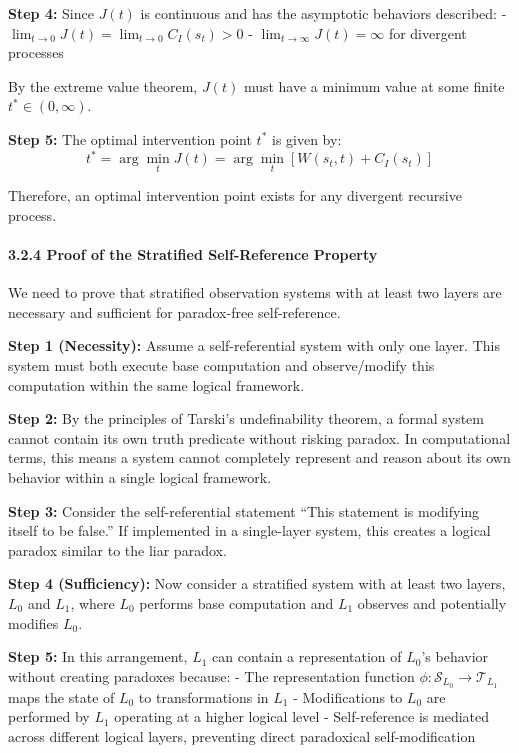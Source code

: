 \documentclass[
]{article}
\begin{document}
\textbf{Step 4:} Since \(J(t)\) is continuous and has the asymptotic
behaviors described: -
\(\lim_{t \to 0} J(t) = \lim_{t \to 0} C_I(s_t) > 0\) -
\(\lim_{t \to \infty} J(t) = \infty\) for divergent processes

By the extreme value theorem, \(J(t)\) must have a minimum value at some
finite \(t^* \in (0, \infty)\).

\textbf{Step 5:} The optimal intervention point \(t^*\) is given by:
\[t^* = \arg\min_{t} J(t) = \arg\min_{t} [W(s_t, t) + C_I(s_t)]\]

Therefore, an optimal intervention point exists for any divergent
recursive process.

\paragraph{3.2.4 Proof of the Stratified Self-Reference
Property}\label{proof-of-the-stratified-self-reference-property}

We need to prove that stratified observation systems with at least two
layers are necessary and sufficient for paradox-free self-reference.

\textbf{Step 1 (Necessity):} Assume a self-referential system with only
one layer. This system must both execute base computation and
observe/modify this computation within the same logical framework.

\textbf{Step 2:} By the principles of Tarski's undefinability theorem, a
formal system cannot contain its own truth predicate without risking
paradox. In computational terms, this means a system cannot completely
represent and reason about its own behavior within a single logical
framework.

\textbf{Step 3:} Consider the self-referential statement ``This
statement is modifying itself to be false.'' If implemented in a
single-layer system, this creates a logical paradox similar to the liar
paradox.

\textbf{Step 4 (Sufficiency):} Now consider a stratified system with at
least two layers, \(L_0\) and \(L_1\), where \(L_0\) performs base
computation and \(L_1\) observes and potentially modifies \(L_0\).

\textbf{Step 5:} In this arrangement, \(L_1\) can contain a
representation of \(L_0\)'s behavior without creating paradoxes because:
- The representation function
\(\phi: \mathcal{S}_{L_0} \rightarrow \mathcal{T}_{L_1}\) maps the state
of \(L_0\) to transformations in \(L_1\) - Modifications to \(L_0\) are
performed by \(L_1\) operating at a higher logical level -
Self-reference is mediated across different logical layers, preventing
direct paradoxical self-modification
\end{document}
